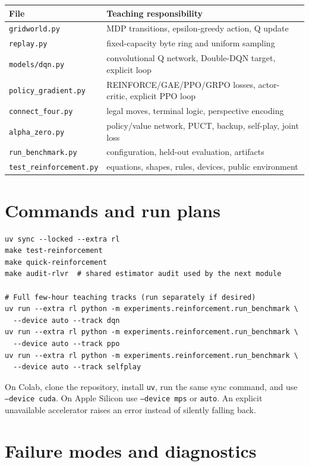 \documentclass[11pt]{article}
\begin{document}
\begin{tabular}{p{}p{}}
\toprule
File & Teaching responsibility \\
\midrule
\texttt{gridworld.py} & MDP transitions, epsilon-greedy action, Q update \\
\texttt{replay.py} & fixed-capacity byte ring and uniform sampling \\
\texttt{models/dqn.py} & convolutional Q network, Double-DQN target, explicit loop \\
\texttt{policy\_gradient.py} & REINFORCE/GAE/PPO/GRPO losses, actor-critic, explicit PPO loop \\
\texttt{connect\_four.py} & legal moves, terminal logic, perspective encoding \\
\texttt{alpha\_zero.py} & policy/value network, PUCT, backup, self-play, joint loss \\
\texttt{run\_benchmark.py} & configuration, held-out evaluation, artifacts \\
\texttt{test\_reinforcement.py} & equations, shapes, rules, devices, public environment \\
\bottomrule
\end{tabular}

\section{Commands and run plans}

\begin{verbatim}
uv sync --locked --extra rl
make test-reinforcement
make quick-reinforcement
make audit-rlvr  # shared estimator audit used by the next module

# Full few-hour teaching tracks (run separately if desired)
uv run --extra rl python -m experiments.reinforcement.run_benchmark \
  --device auto --track dqn
uv run --extra rl python -m experiments.reinforcement.run_benchmark \
  --device auto --track ppo
uv run --extra rl python -m experiments.reinforcement.run_benchmark \
  --device auto --track selfplay
\end{verbatim}

On Colab, clone the repository, install \texttt{uv}, run the same sync command,
and use \texttt{--device cuda}. On Apple Silicon use \texttt{--device mps} or
\texttt{auto}. An explicit unavailable accelerator raises an error instead of
silently falling back.

\section{Failure modes and diagnostics}
\end{document}
